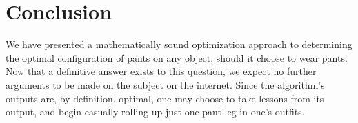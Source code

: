\documentclass[twocolumn]{article}
\begin{document}
\section{Conclusion}
We have presented a mathematically sound optimization approach to determining the optimal configuration of pants on any object, should it choose to wear pants. Now that a definitive answer exists to this question, we expect no further arguments to be made on the subject on the internet. Since the algorithm's outputs are, by definition, optimal, one may choose to take lessons from its output, and begin casually rolling up just one pant leg in one's outfits.



\end{document}
